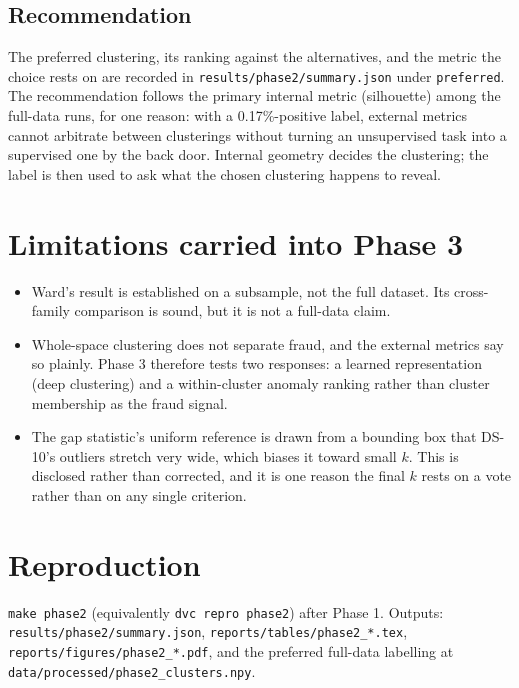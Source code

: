 \documentclass[11pt, a4paper]{article}
\providecommand{\num}[1]{#1}
\begin{document}
\subsection{Recommendation}
The preferred clustering, its ranking against the alternatives, and the metric
the choice rests on are recorded in \texttt{results/phase2/summary.json} under
\texttt{preferred}. The recommendation follows the primary internal metric
(silhouette) among the full-data runs, for one reason: with a
\num{0.17}\%-positive label, external metrics cannot arbitrate between
clusterings without turning an unsupervised task into a supervised one by the
back door. Internal geometry decides the clustering; the label is then used to
ask what the chosen clustering happens to reveal.

\section{Limitations carried into Phase 3}
\begin{itemize}
  \item Ward's result is established on a subsample, not the full dataset. Its
        cross-family comparison is sound, but it is not a full-data claim.
  \item Whole-space clustering does not separate fraud, and the external metrics
        say so plainly. Phase 3 therefore tests two responses: a learned
        representation (deep clustering) and a within-cluster anomaly ranking
        rather than cluster membership as the fraud signal.
  \item The gap statistic's uniform reference is drawn from a bounding box that
        DS-10's outliers stretch very wide, which biases it toward small $k$.
        This is disclosed rather than corrected, and it is one reason the final
        $k$ rests on a vote rather than on any single criterion.
\end{itemize}

\section*{Reproduction}
\texttt{make phase2} (equivalently \texttt{dvc repro phase2}) after Phase 1.
Outputs: \texttt{results/phase2/summary.json},
\texttt{reports/tables/phase2\_*.tex}, \texttt{reports/figures/phase2\_*.pdf},
and the preferred full-data labelling at
\texttt{data/processed/phase2\_clusters.npy}.
\end{document}
